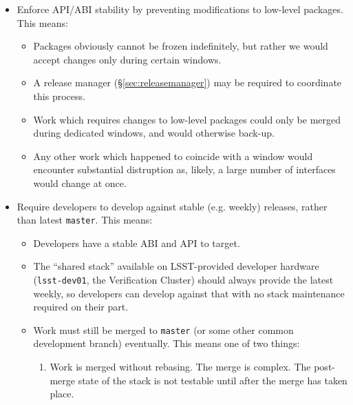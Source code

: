 \documentclass[letterpaper]{scrartcl}
\begin{document}
\begin{itemize}

  \item{Enforce API/ABI stability by preventing modifications to low-level
  packages. This means:

    \begin{itemize}

      \item{Packages obviously cannot be frozen indefinitely, but rather we
      would accept changes only during certain windows.}

      \item{A release manager (\S\ref{sec:releasemanager}) may be required
      to coordinate this process.}

      \item{Work which requires changes to low-level packages could only be
      merged during dedicated windows, and would otherwise back-up.}

      \item{Any other work which happened to coincide with a window would
      encounter substantial distruption as, likely, a large number of
      interfaces would change at once.}

    \end{itemize}

  }

  \item{Require developers to develop against stable (e.g. weekly) releases,
  rather than latest \texttt{master}. This means:

    \begin{itemize}

      \item{Developers have a stable ABI and API to target.}

      \item{The ``shared stack'' available on LSST-provided developer hardware
      (\texttt{lsst-dev01}, the Verification Cluster) should always provide
      the latest weekly, so developers can develop against that with no stack
      maintenance required on their part.}

      \item{Work must still be merged to \texttt{master} (or some other
      common development branch) eventually. This means one of two things:

        \begin{enumerate}

          \item{Work is merged without rebasing. The merge is complex. The
          post-merge state of the stack is not testable until after the merge
          has taken place.}


\end{enumerate}}
\end{itemize}}
\end{itemize}
\end{document}
